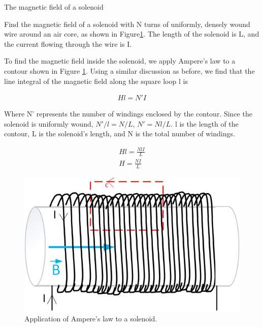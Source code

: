\documentclass{ximera}
\begin{document}
\begin{example}
The magnetic field of a solenoid

Find the magnetic field of a solenoid with N turns of uniformly, densely wound wire around an air core, as shown in Figure\ref{fig:solenoid}. The length of the solenoid is L, and the current flowing through the wire is I.  

\begin{explanation}

To find the magnetic field inside the solenoid, we apply Ampere's law to a contour shown in Figure \ref{fig:solenoid}. Using a similar discussion as before, we find that the line integral of the magnetic field along the square loop l is 

\begin{eqnarray}
H l = N' I
\end{eqnarray}

Where N' represents the number of windings enclosed by the contour. Since the solenoid is uniformly wound, 
$N'/l=N/L$, $N'=N l/L$. l is the length of the contour, L is the solenoid's length, and N is the total number of windings.


\begin{eqnarray}
H  l = \frac{N l I}{L} \\
H = \frac{N I}{L} 
\end{eqnarray}

\begin{figure}[ht]
\begin{center}
\includegraphics[scale=0.5]{../jpg/Solenoid.jpg}
\end{center}
\caption{Application of Ampere's law to a solenoid.}
\label{fig:solenoid}
\end{figure}


\end{explanation}
\end{example}
\end{document}
